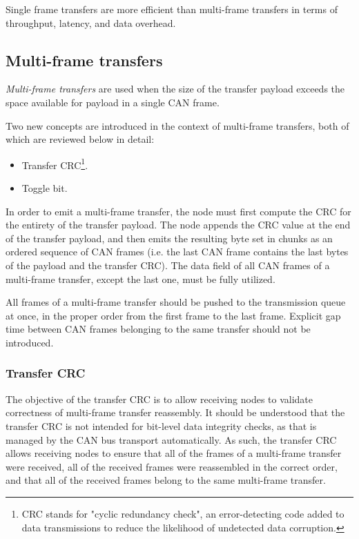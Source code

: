 Single frame transfers are more efficient than multi-frame transfers in terms of throughput, latency,
and data overhead.

\subsection{Multi-frame transfers}

\emph{Multi-frame transfers} are used when the size of the transfer payload exceeds the space available
for payload in a single CAN frame.

Two new concepts are introduced in the context of multi-frame transfers, both of which are reviewed below in detail:
\begin{itemize}
    \item Transfer CRC\footnote{CRC stands for "cyclic redundancy check", an error-detecting code
    added to data transmissions to reduce the likelihood of undetected data corruption.}.
    \item Toggle bit.
\end{itemize}

In order to emit a multi-frame transfer, the node must first compute the CRC for the entirety of the transfer payload.
The node appends the CRC value at the end of the transfer payload,
and then emits the resulting byte set in chunks as an ordered sequence of CAN frames
(i.e. the last CAN frame contains the last bytes of the payload and the transfer CRC).
The data field of all CAN frames of a multi-frame transfer, except the last one, must be fully utilized.

All frames of a multi-frame transfer should be pushed to the transmission queue at once,
in the proper order from the first frame to the last frame.
Explicit gap time between CAN frames belonging to the same transfer should not be introduced.

\subsubsection{Transfer CRC}\label{sec:transfer_crc}

The objective of the transfer CRC is to allow receiving nodes to validate correctness of
multi-frame transfer reassembly.
It should be understood that the transfer CRC is not intended for bit-level data integrity checks,
as that is managed by the CAN bus transport automatically.
As such, the transfer CRC allows receiving nodes to ensure that all of the frames of a multi-frame
transfer were received, all of the received frames were reassembled in the correct order,
and that all of the received frames belong to the same multi-frame transfer.

